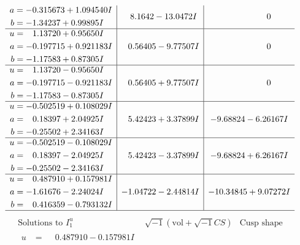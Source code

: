 \documentclass[1p]{elsarticle_modified}
\theoremstyle{definition}
\newcommand{\I}{\sqrt{-1}}
\begin{document}
$$\begin{array}{c|c|c}
\begin{aligned}
a &= -0.315673 + 1.094540 I \\
b &= -1.34237 + 0.99895 I\end{aligned}
 & \phantom{-}8.1642 - 13.0472 I & \phantom{-0.000000 } 0 \\ \hline\begin{aligned}
u &= \phantom{-}1.13720 + 0.95650 I \\
a &= -0.197715 + 0.921183 I \\
b &= -1.17583 + 0.87305 I\end{aligned}
 & \phantom{-}0.56405 - 9.77507 I & \phantom{-0.000000 } 0 \\ \hline\begin{aligned}
u &= \phantom{-}1.13720 - 0.95650 I \\
a &= -0.197715 - 0.921183 I \\
b &= -1.17583 - 0.87305 I\end{aligned}
 & \phantom{-}0.56405 + 9.77507 I & \phantom{-0.000000 } 0 \\ \hline\begin{aligned}
u &= -0.502519 + 0.108029 I \\
a &= \phantom{-}0.18397 + 2.04925 I \\
b &= -0.25502 + 2.34163 I\end{aligned}
 & \phantom{-}5.42423 + 3.37899 I & -9.68824 - 6.26167 I \\ \hline\begin{aligned}
u &= -0.502519 - 0.108029 I \\
a &= \phantom{-}0.18397 - 2.04925 I \\
b &= -0.25502 - 2.34163 I\end{aligned}
 & \phantom{-}5.42423 - 3.37899 I & -9.68824 + 6.26167 I \\ \hline\begin{aligned}
u &= \phantom{-}0.487910 + 0.157981 I \\
a &= -1.61676 - 2.24024 I \\
b &= \phantom{-}0.416359 - 0.793132 I\end{aligned}
 & -1.04722 - 2.44814 I & -10.34845 + 9.07272 I\\
 \hline 
 \end{array}$$\newpage$$\begin{array}{c|c|c}  
\text{Solutions to }I^u_{1}& \I (\text{vol} + \sqrt{-1}CS) & \text{Cusp shape}\\
 \hline 
\begin{aligned}
u &= \phantom{-}0.487910 - 0.157981 I \\

\end{aligned}
\end{array}$$
\end{document}
